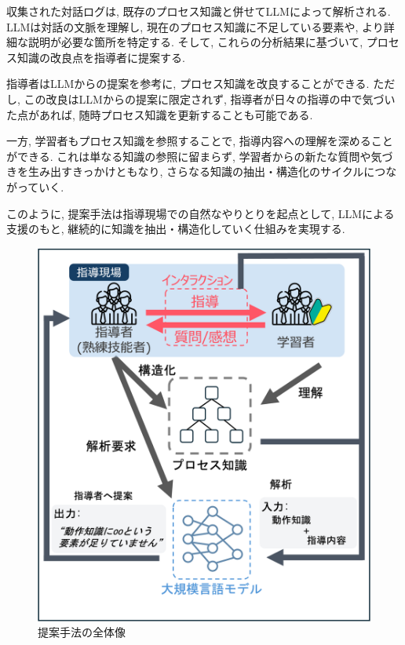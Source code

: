 収集された対話ログは, 既存のプロセス知識と併せてLLMによって解析される. LLMは対話の文脈を理解し, 現在のプロセス知識に不足している要素や, より詳細な説明が必要な箇所を特定する. そして, これらの分析結果に基づいて, プロセス知識の改良点を指導者に提案する. 

指導者はLLMからの提案を参考に, プロセス知識を改良することができる. ただし, この改良はLLMからの提案に限定されず, 指導者が日々の指導の中で気づいた点があれば, 随時プロセス知識を更新することも可能である. 

一方, 学習者もプロセス知識を参照することで, 指導内容への理解を深めることができる. これは単なる知識の参照に留まらず, 学習者からの新たな質問や気づきを生み出すきっかけともなり, さらなる知識の抽出・構造化のサイクルにつながっていく. 

このように, 提案手法は指導現場での自然なやりとりを起点として, LLMによる支援のもと, 継続的に知識を抽出・構造化していく仕組みを実現する. 

\begin{figure}[htbp]
    \centering
    \includegraphics[width=1.0\linewidth]{./image/overview_2.png}
    \caption{提案手法の全体像}
    \label{fig1}
\end{figure}
